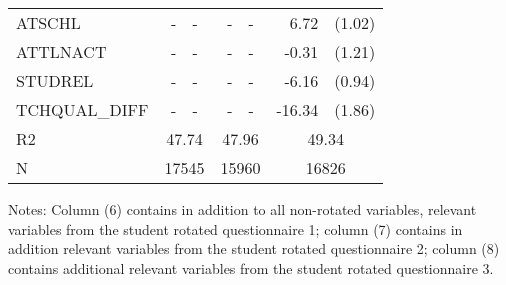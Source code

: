 \documentclass[10pt]{article}
\begin{document}
\begin{table}[H]
\begin{threeparttable}
\begin{tabular}{lrlrlrl}
				ATSCHL & -     & -     & -     & -     & 6.72  & (1.02) \\[0.2em]
				ATTLNACT & -     & -     & -     & -     & -0.31 & (1.21) \\[0.2em]
				STUDREL & -     & -     & -     & -     & -6.16 & (0.94) \\[0.2em]
				TCHQUAL\_DIFF & -     & -     & -     & -     & -16.34 & (1.86) \\[0.2em]
				R2    & \multicolumn{2}{c}{47.74} & \multicolumn{2}{c}{47.96} & \multicolumn{2}{c}{49.34} \\
				N     & \multicolumn{2}{c}{17545} & \multicolumn{2}{c}{15960} & \multicolumn{2}{c}{16826} \\
				\bottomrule
			\end{tabular}%
			\begin{tablenotes}
				Notes: Column (6) contains in addition to all non-rotated variables, relevant variables from the student rotated questionnaire 1; column (7) contains in addition relevant variables from the student rotated questionnaire 2; column (8) contains additional relevant variables from the student rotated questionnaire 3. 
			\end{tablenotes}
		\end{threeparttable}
	\end{table}%
\end{document}
